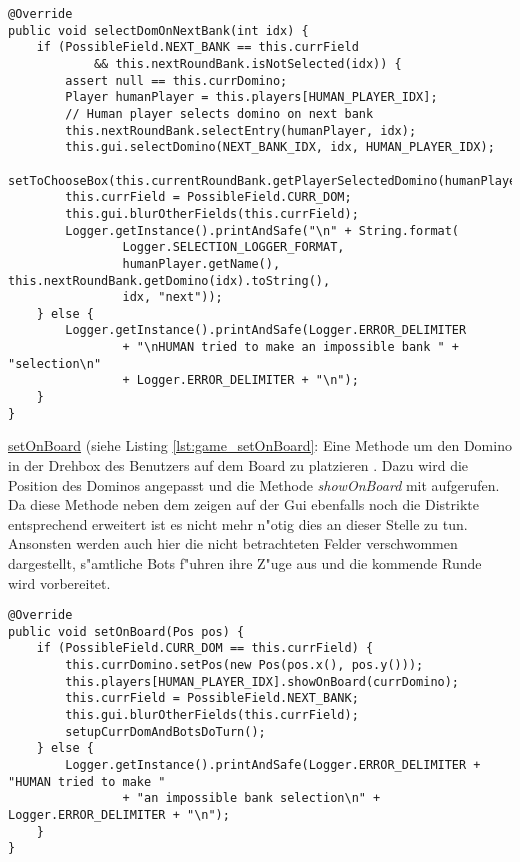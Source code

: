 \begin{lstlisting}[float,style=CodeHighlighting,caption=Game - selectDomOnNextBank,label=game_selectDomOnNextBank]
@Override
public void selectDomOnNextBank(int idx) {
    if (PossibleField.NEXT_BANK == this.currField 
    		&& this.nextRoundBank.isNotSelected(idx)) {
        assert null == this.currDomino;
        Player humanPlayer = this.players[HUMAN_PLAYER_IDX];
        // Human player selects domino on next bank
        this.nextRoundBank.selectEntry(humanPlayer, idx);
        this.gui.selectDomino(NEXT_BANK_IDX, idx, HUMAN_PLAYER_IDX);
        setToChooseBox(this.currentRoundBank.getPlayerSelectedDomino(humanPlayer));
        this.currField = PossibleField.CURR_DOM;
        this.gui.blurOtherFields(this.currField);
        Logger.getInstance().printAndSafe("\n" + String.format(
        		Logger.SELECTION_LOGGER_FORMAT,
                humanPlayer.getName(), this.nextRoundBank.getDomino(idx).toString(),
                idx, "next"));
    } else {
        Logger.getInstance().printAndSafe(Logger.ERROR_DELIMITER
                + "\nHUMAN tried to make an impossible bank " + "selection\n" 
                + Logger.ERROR_DELIMITER + "\n");
    }
}
\end{lstlisting}

\underline{setOnBoard} (siehe Listing \ref{lst:game_setOnBoard}: Eine Methode um den Domino in der Drehbox des Benutzers auf dem Board zu platzieren . Dazu wird die Position des Dominos angepasst und die Methode \emph{showOnBoard} mit aufgerufen. Da diese Methode neben dem zeigen auf der Gui ebenfalls noch die Distrikte entsprechend erweitert ist es nicht mehr n"otig dies an dieser Stelle zu tun. Ansonsten werden auch hier die nicht betrachteten Felder verschwommen dargestellt, s"amtliche Bots f"uhren ihre Z"uge aus und die kommende Runde wird vorbereitet. 

\begin{lstlisting}[float,style=CodeHighlighting,caption=Game - setOnBoard,label=lst:game_setOnBoard]
@Override
public void setOnBoard(Pos pos) {
    if (PossibleField.CURR_DOM == this.currField) {
        this.currDomino.setPos(new Pos(pos.x(), pos.y()));
        this.players[HUMAN_PLAYER_IDX].showOnBoard(currDomino);
        this.currField = PossibleField.NEXT_BANK;
        this.gui.blurOtherFields(this.currField);
        setupCurrDomAndBotsDoTurn();
    } else {
        Logger.getInstance().printAndSafe(Logger.ERROR_DELIMITER + "HUMAN tried to make "
        		+ "an impossible bank selection\n" + Logger.ERROR_DELIMITER + "\n");
    }
}
\end{lstlisting}


